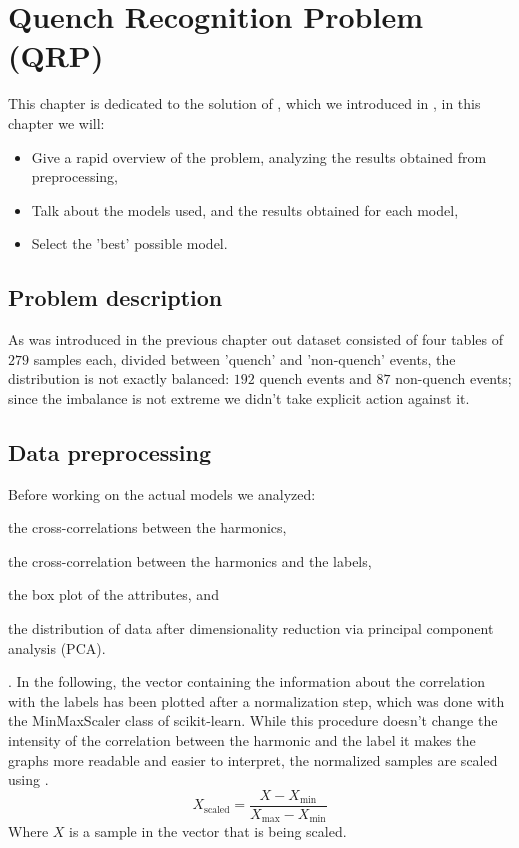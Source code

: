 \chapter{Quench Recognition Problem (QRP)}
\label{chp:qrp}
This chapter is dedicated to the solution of \qrp, which we introduced in , in this chapter we will:
\begin{itemize}
	\item Give a rapid overview of the problem, analyzing the results obtained from
	      preprocessing,
	\item Talk about the models used, and the results obtained for each model,
	\item Select the 'best' possible model.
\end{itemize}

\section{Problem description}
As was introduced in the previous chapter out dataset consisted of four tables of $279$ samples
each, divided between 'quench' and 'non-quench' events, the distribution is not exactly balanced:
$192$ quench events and $87$ non-quench events; since the imbalance is not extreme we didn't take
explicit action against it.

\section{Data preprocessing}
Before working on the actual models we analyzed:
\begin{inparaenum}[(i)]
	\item the cross-correlations between the harmonics,
	\item the cross-correlation between the harmonics and the labels,
	\item the box plot of the attributes, and
	\item the distribution of data after dimensionality reduction via principal component analysis (PCA).
\end{inparaenum}.
In the following, the vector containing the information about the correlation with the labels has been plotted after a
normalization step, which was done with the MinMaxScaler class of scikit-learn. While this procedure
doesn't change the intensity of the correlation between the harmonic and the label it makes the
graphs more readable and easier to interpret, the normalized samples are scaled using
 \cite{Nishok2024}.
\begin{equation}
	\label{eq:normalization}
	X_\text{scaled} = \frac{X - X_\text{min}}{X_\text{max} - X_\text{min}}
\end{equation}
Where $X$ is a sample in the vector that is being scaled.

